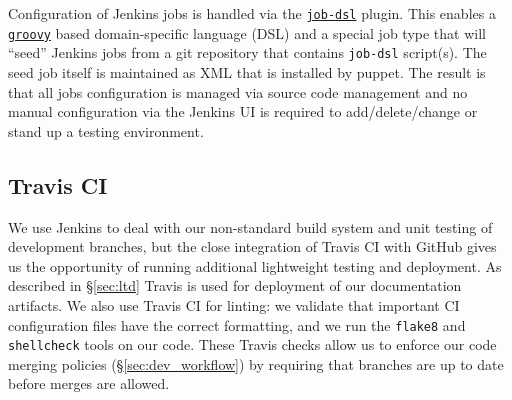 Configuration of Jenkins jobs is handled via the \href{https://plugins.jenkins.io/job-dsl}{\texttt{job-dsl}} plugin.
This enables a \href{http://www.groovy-lang.org/}{\texttt{groovy}} based domain-specific language (DSL) and a special job type that
will ``seed'' Jenkins jobs from a git repository that contains \texttt{job-dsl}
script(s).  The seed job itself is maintained as XML that is
installed by puppet.  The result is that all jobs configuration is managed via
source code management and no manual configuration via the Jenkins UI is required to
add/delete/change or stand up a testing environment.





\subsection{Travis CI}
\label{sec:travis-ci}

We use Jenkins to deal with our non-standard build system and unit testing of development branches, but the close integration of Travis CI with GitHub gives us the opportunity of running additional lightweight testing and deployment.
As described in \S\ref{sec:ltd} Travis is used for deployment of our documentation artifacts.
We also use Travis CI for linting: we validate that important CI configuration files have the correct formatting, and we run the \texttt{flake8} and \texttt{shellcheck} tools on our code.
These Travis checks allow us to enforce our code merging policies (\S\ref{sec:dev_workflow}) by requiring that branches are up to date before merges are allowed.
